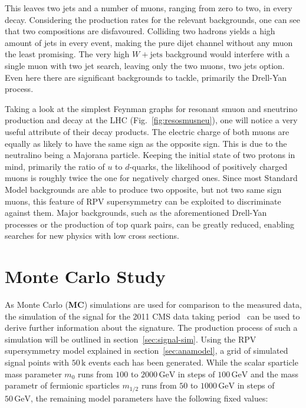 This leaves two jets and a number of muons, ranging from zero to two, in every decay. Considering the production rates for the relevant backgrounds, one can see that two compositions are disfavoured. Colliding two hadrons yields a high amount of jets in every event, making the pure dijet channel without any muon the least promising. The very high $W + \text{jets}$ background would interfere with a single muon with two jet search, leaving only the two muons, two jets option. Even here there are significant backgrounds to tackle, primarily the Drell-Yan process.

Taking a look at the simplest Feynman graphs for resonant smuon and sneutrino production and decay at the LHC (Fig.~\ref{fig:resosmusneu}), one will notice a very useful attribute of their decay products. The electric charge of both muons are equally as likely to have the same sign as the opposite sign. This is due to the neutralino being a Majorana particle. Keeping the initial state of two protons in mind, primarily the ratio of $u$ to $d$-quarks, the likelihood of positively charged muons is roughly twice the one for negatively charged ones. Since most Standard Model backgrounds are able to produce two opposite, but not two same sign muons, this feature of RPV supersymmetry can be exploited to discriminate against them. Major backgrounds, such as the aforementioned Drell-Yan processes or the production of top quark pairs, can be greatly reduced, enabling searches for new physics with low cross sections.


\section{Monte Carlo Study}
\label{sec:mcstudy}

As Monte Carlo (\textbf{MC}) simulations are used for comparison to the measured data, the simulation of the signal for the 2011 CMS data taking period~\cite{2011rpv} can be used to derive further information about the signature. The production process of such a simulation will be outlined in section~\ref{sec:signal-sim}. Using the RPV supersymmetry model explained in section~\ref{sec:anamodel}, a grid of simulated signal points with $50\,\text{k}$ events each has been generated. While the scalar sparticle mass parameter $m_0$ runs from $100$ to $2000\,\text{GeV}$ in steps of $100\,\text{GeV}$ and the mass parametr of fermionic sparticles $m_{1/2}$ runs from $50$ to $1000\,\text{GeV}$ in steps of $50\,\text{GeV}$, the remaining model parameters have the following fixed values:


